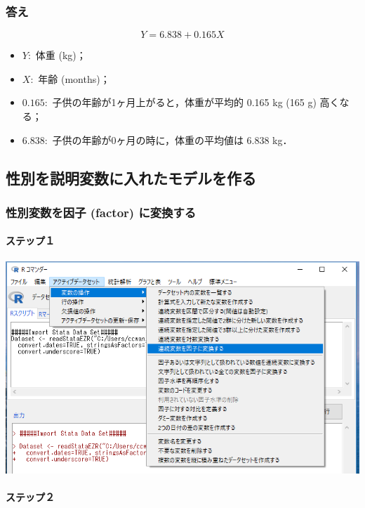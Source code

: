 \documentclass[]{problemset}
\providecommand{\tightlist}{%
  \setlength{\itemsep}{0pt}\setlength{\parskip}{0pt}}
\let\oldparagraph\paragraph
\renewcommand{\paragraph}[1]{\oldparagraph{#1}\mbox{}}
\begin{document}
\hypertarget{-3}{%
\subsubsection{答え}\label{-3}}

\[
Y = 6.838 + 0.165 X
\]

\begin{itemize}
\tightlist
\item
  \(Y:\) 体重 (kg)；
\item
  \(X:\) 年齢 (months)；
\item
  \(0.165:\) 子供の年齢が1ヶ月上がると，体重が平均的 0.165 kg (165 g)
  高くなる；
\item
  \(6.838:\) 子供の年齢が0ヶ月の時に，体重の平均値は 6.838 kg．
\end{itemize}

\subsection{性別を説明変数に入れたモデルを作る}

\hypertarget{-factor-}{%
\subsubsection{性別変数を因子 (factor) に変換する}\label{-factor-}}

\hypertarget{-8}{%
\paragraph{ステップ１}\label{-8}}

\begin{center}\includegraphics[width=0.8\linewidth]{pic/sexfactor00} \end{center}

\hypertarget{-9}{%
\paragraph{ステップ２}\label{-9}}
\end{document}
